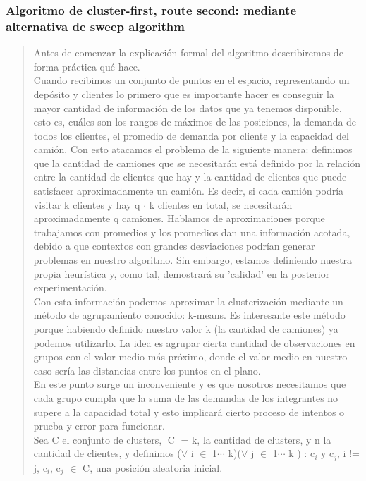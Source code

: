 \documentclass[11pt,a4paper]{article}
\begin{document}
\subsubsection{Algoritmo de cluster-first, route second: mediante alternativa de sweep algorithm}
\begin{verse}
Antes de comenzar la explicación formal del algoritmo describiremos de forma práctica qué hace. \\
Cuando recibimos un conjunto de puntos en el espacio, representando un depósito y clientes lo primero que es importante hacer es conseguir la mayor cantidad de información de los datos que ya tenemos disponible, esto es, cuáles son los rangos de máximos de las posiciones, la demanda de todos los clientes, el promedio de demanda por cliente y la capacidad del camión. Con esto atacamos el problema de la siguiente manera: definimos que la cantidad de camiones que se necesitarán está definido por la relación entre la cantidad de clientes que hay y la cantidad de clientes que puede satisfacer aproximadamente un camión. Es decir, si cada camión podría visitar k clientes y hay q $\cdot$ k clientes en total, se necesitarán aproximadamente q camiones. Hablamos de aproximaciones porque trabajamos con promedios y los promedios dan una información acotada, debido a que contextos con grandes desviaciones podrían generar problemas en nuestro algoritmo. Sin embargo, estamos definiendo nuestra propia heurística y, como tal, demostrará su 'calidad' en la posterior experimentación. \\
Con esta información podemos aproximar la clusterización mediante un método de agrupamiento conocido: k-means. Es interesante este método porque habiendo definido nuestro valor k (la cantidad de camiones) ya podemos utilizarlo. La idea es agrupar cierta cantidad de observaciones en grupos con el valor medio más próximo, donde el valor medio en nuestro caso sería las distancias entre los puntos en el plano.\\
En este punto surge un inconveniente y es que nosotros necesitamos que cada grupo cumpla que la suma de las demandas de los integrantes no supere a la capacidad total y esto implicará cierto proceso de intentos o prueba y error para funcionar.\\
Sea C el conjunto de clusters, |C| = k, la cantidad de clusters, y n la cantidad de clientes, y definimos ($\forall$ i $\in$ {1$\cdots$ k})($\forall$ j $\in$ { 1$\cdots$ k }) : c$_{i}$ y c$_{j}$, i != j, c$_{i}$, c$_{j}$ $\in$ C, una posición aleatoria inicial.\\

\end{verse}
\end{document}
